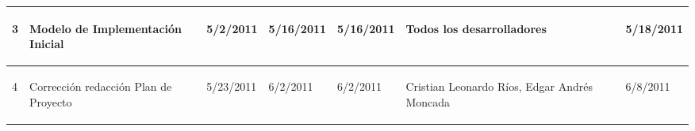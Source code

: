\begin{center}
\begin{longtable}{|p{}|p{}|p{}|p{}|p{}|p{}|p{}|p{}|}
{\begin{center} 3 \end{center}} & 
{\begin{center} Modelo de Implementación Inicial \end{center}} & 
{\begin{center} 5/2/2011 \end{center}} & 
{\begin{center} 5/16/2011 \end{center}} & 
{\begin{center} 5/16/2011 \end{center}} & 
{\begin{center} Todos los desarrolladores \end{center}} & 
{\begin{center}  \end{center}} & 
{\begin{center} 5/18/2011 \end{center}}\\
\hline


{\begin{center} 4 \end{center}} & 
{\begin{center} Corrección redacción Plan de Proyecto \end{center}} & 
{\begin{center} 5/23/2011 \end{center}} & 
{\begin{center} 6/2/2011 \end{center}} & 
{\begin{center} 6/2/2011 \end{center}} & 
{\begin{center} Cristian Leonardo Ríos, Edgar Andrés Moncada \end{center}} & 
{\begin{center}  \end{center}} & 
{\begin{center} 6/8/2011 \end{center}}\\
\hline


\end{longtable}
\end{center}
